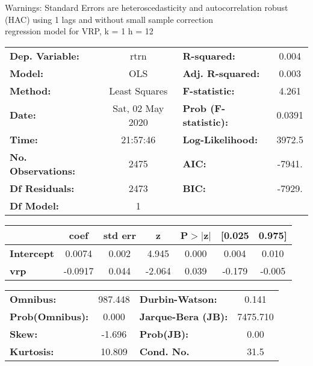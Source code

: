 Warnings: \newline
 [1] Standard Errors are heteroscedasticity and autocorrelation robust (HAC) using 1 lags and without small sample correction\\ 

regression model for VRP, k = 1 h = 12\begin{center}
\begin{tabular}{lclc}
\toprule
\textbf{Dep. Variable:}    &       rtrn       & \textbf{  R-squared:         } &     0.004   \\
\textbf{Model:}            &       OLS        & \textbf{  Adj. R-squared:    } &     0.003   \\
\textbf{Method:}           &  Least Squares   & \textbf{  F-statistic:       } &     4.261   \\
\textbf{Date:}             & Sat, 02 May 2020 & \textbf{  Prob (F-statistic):} &   0.0391    \\
\textbf{Time:}             &     21:57:46     & \textbf{  Log-Likelihood:    } &    3972.5   \\
\textbf{No. Observations:} &        2475      & \textbf{  AIC:               } &    -7941.   \\
\textbf{Df Residuals:}     &        2473      & \textbf{  BIC:               } &    -7929.   \\
\textbf{Df Model:}         &           1      & \textbf{                     } &             \\
\bottomrule
\end{tabular}
\begin{tabular}{lcccccc}
                   & \textbf{coef} & \textbf{std err} & \textbf{z} & \textbf{P$> |$z$|$} & \textbf{[0.025} & \textbf{0.975]}  \\
\midrule
\textbf{Intercept} &       0.0074  &        0.002     &     4.945  &         0.000        &        0.004    &        0.010     \\
\textbf{vrp}       &      -0.0917  &        0.044     &    -2.064  &         0.039        &       -0.179    &       -0.005     \\
\bottomrule
\end{tabular}
\begin{tabular}{lclc}
\textbf{Omnibus:}       & 987.448 & \textbf{  Durbin-Watson:     } &    0.141  \\
\textbf{Prob(Omnibus):} &   0.000 & \textbf{  Jarque-Bera (JB):  } & 7475.710  \\
\textbf{Skew:}          &  -1.696 & \textbf{  Prob(JB):          } &     0.00  \\
\textbf{Kurtosis:}      &  10.809 & \textbf{  Cond. No.          } &     31.5  \\
\bottomrule
\end{tabular}
\end{center}

